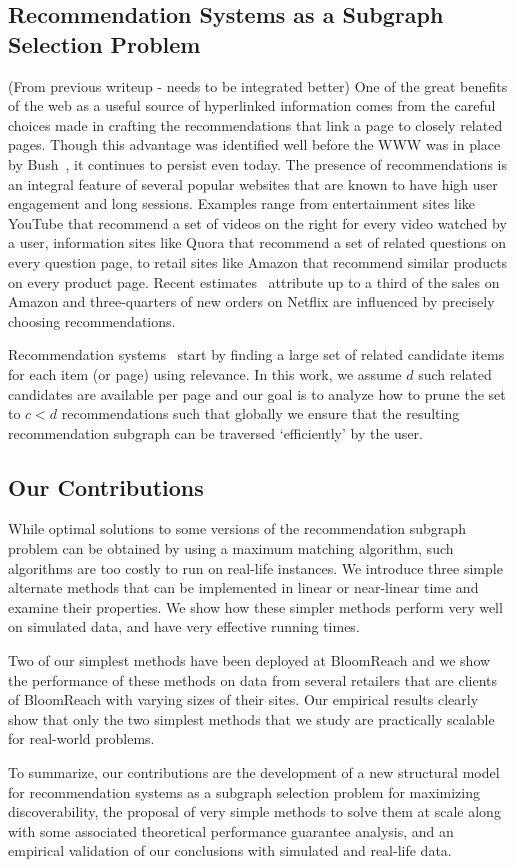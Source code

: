 \subsection{Recommendation Systems as a Subgraph Selection Problem}

(From previous writeup - needs to be integrated better)
One of the great benefits of the web as a useful source of hyperlinked
information comes from the careful choices made in crafting the
recommendations that link a page to closely related pages. Though this
advantage was identified well before the WWW was in place by
Bush~\cite{Bush45aswe}, it continues to persist even today. The
presence of recommendations is an integral feature of several popular
websites that are known to have high user engagement and long
sessions. Examples range from entertainment sites like YouTube that
recommend a set of videos on the right for every video watched by a
user, information sites like Quora that recommend a set of related
questions on every question page, to retail sites like Amazon that
recommend similar products on every product page. Recent
estimates~\cite{big-data-book13} attribute up to a third of the sales
on Amazon and three-quarters of new orders on Netflix are influenced by precisely choosing recommendations.

Recommendation systems~\cite{Schafer1999, Adomavicius2005,
  Resnick1997} start by finding a large set of related candidate items
for each item (or page) using relevance. In this work, we assume $d$
such related candidates are available per page and our goal is to
analyze how to prune the set to $c < d$ recommendations such that
globally we ensure that the resulting recommendation subgraph can be traversed
`efficiently' by the user.

\subsection{Our Contributions}
While optimal solutions to some versions of the recommendation subgraph problem can be obtained by using a maximum matching algorithm, such algorithms are too costly to run on real-life instances. We introduce three simple alternate methods that can be implemented in linear or near-linear time and examine their properties. We show how these simpler methods perform very well on simulated data, and have very effective running times.

Two of our simplest methods have been deployed at BloomReach and we show the performance of these methods on data from several retailers that are clients of BloomReach with varying sizes of their sites. Our empirical results clearly show that only the two simplest methods that we study are practically scalable for real-world problems.

To summarize, our contributions are the development of a new structural model for recommendation systems as a subgraph selection problem for maximizing discoverability, the proposal of very simple methods to solve them at scale along with some associated theoretical performance guarantee analysis, and an empirical validation of our conclusions with simulated and real-life data.

